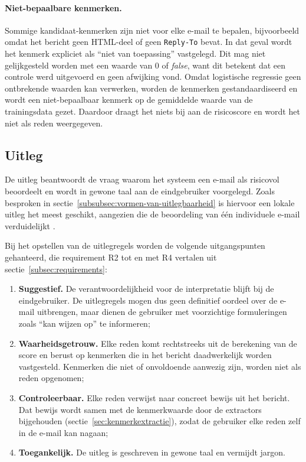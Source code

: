 

\paragraph{Niet-bepaalbare kenmerken.}
Sommige kan\-di\-daat-kenmerken zijn niet voor elke e-mail te bepalen, bijvoorbeeld omdat het bericht geen HTML-deel of geen \texttt{Reply-To} bevat. In dat geval wordt het kenmerk expliciet als ``niet van toepassing'' vastgelegd. Dit mag niet gelijkgesteld worden met een waarde van 0 of \emph{false}, want dit betekent dat een controle werd uitgevoerd en geen afwijking vond. Omdat logistische regressie geen ontbrekende waarden kan verwerken, worden de kenmerken gestandaardiseerd en wordt een niet-bepaalbaar kenmerk op de gemiddelde waarde van de trainingsdata gezet. Daardoor draagt het niets bij aan de risicoscore en wordt het niet als reden weergegeven.

\subsection{Uitleg}
\label{subsec:uitleg}

De uitleg beantwoordt de vraag waarom het systeem een e-mail als risicovol beoordeelt en wordt in gewone taal aan de eindgebruiker voorgelegd. Zoals besproken in sectie~\ref{subsubsec:vormen-van-uitlegbaarheid} is hiervoor een lokale uitleg het meest geschikt, aangezien die de beoordeling van één individuele e-mail verduidelijkt \autocite{Guidotti2018}.

Bij het opstellen van de uitlegregels worden de volgende uitgangspunten gehanteerd, die requirement R2 tot en met R4 vertalen uit sectie~\ref{subsec:requirements}:
\begin{enumerate}
    \item \textbf{Suggestief.} De verantwoordelijkheid voor de interpretatie blijft bij de eindgebruiker. De uitlegregels mogen dus geen definitief oordeel over de e-mail uitbrengen, maar dienen de gebruiker met voorzichtige formuleringen zoals ``kan wijzen op'' te informeren;
    \item \textbf{Waarheidsgetrouw.} Elke reden komt rechtstreeks uit de berekening van de score en berust op kenmerken die in het bericht daadwerkelijk worden vastgesteld. Kenmerken die niet of onvoldoende aanwezig zijn, worden niet als reden opgenomen;
    \item \textbf{Controleerbaar.} Elke reden verwijst naar concreet bewijs uit het bericht. Dat bewijs wordt samen met de kenmerkwaarde door de extractors bijgehouden (sectie~\ref{sec:kenmerkextractie}), zodat de gebruiker elke reden zelf in de e-mail kan nagaan;
     \item \textbf{Toegankelijk.} De uitleg is geschreven in gewone taal en vermijdt jargon.
\end{enumerate}

